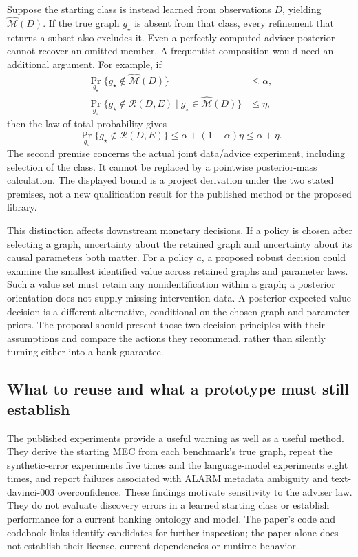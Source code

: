 Suppose the starting class is instead learned from observations $D$, yielding
$\widehat{\mathcal M}(D)$. If the true graph $g_\star$ is absent from that
class, every refinement that returns a subset also excludes it. Even a
perfectly computed adviser posterior cannot recover an omitted member. A
frequentist composition would need an additional argument. For example, if
\begin{equation}
\begin{split}
 \Pr_{g_\star}\{g_\star\notin\widehat{\mathcal M}(D)\}&\leq\alpha,\\
 \Pr_{g_\star}\{g_\star\notin\mathcal R(D,E)
       \mid g_\star\in\widehat{\mathcal M}(D)\}&\leq\eta,
\end{split}
\label{exec17:advice-coverage-premises}
\end{equation}
then the law of total probability gives
\begin{equation}
 \Pr_{g_\star}\{g_\star\notin\mathcal R(D,E)\}
       \leq\alpha+(1-\alpha)\eta\leq\alpha+\eta.
\label{exec17:advice-coverage-composition}
\end{equation}
The second premise concerns the actual joint data/advice experiment, including
selection of the class. It cannot be replaced by a pointwise posterior-mass
calculation. The displayed bound is a project derivation under the two stated
premises, not a new qualification result for the published method or the
proposed library.

This distinction affects downstream monetary decisions. If a policy is chosen
after selecting a graph, uncertainty about the retained graph and uncertainty
about its causal parameters both matter. For a policy $a$, a proposed robust
decision could examine the smallest identified value across retained graphs
and parameter laws. Such a value set must retain any nonidentification within
a graph; a posterior orientation does not supply missing intervention data.
A posterior expected-value decision is a different alternative, conditional
on the chosen graph and parameter priors. The proposal should present those
two decision principles with their assumptions and compare the actions they
recommend, rather than silently turning either into a bank guarantee.

\subsection{What to reuse and what a prototype must still establish}

The published experiments provide a useful warning as well as a useful method.
They derive the starting MEC from each benchmark's true graph, repeat the
synthetic-error experiments five times and the language-model experiments
eight times, and report failures associated with ALARM metadata ambiguity and
text-davinci-003 overconfidence. These findings motivate sensitivity to the
adviser law. They do not evaluate discovery errors in a learned starting class
or establish performance for a current banking ontology and model. The
paper's code and codebook links identify candidates for further inspection;
the paper alone does not establish their license, current dependencies or
runtime behavior.\citep{exec17_imperfect_experts}

